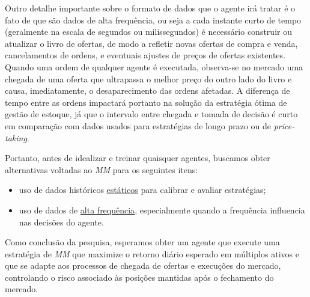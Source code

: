 Outro detalhe importante sobre o formato de dados que o agente irá tratar é o fato de que são dados de alta frequência, ou seja a cada instante curto de tempo (geralmente na escala de segundos ou milissegundos) é necessário construir ou atualizar o livro de ofertas, de modo a refletir novas ofertas de compra e venda, cancelamentos de ordens, e eventuais ajustes de preços de ofertas existentes.
Quando uma ordem de qualquer agente é executada, observa-se no mercado uma chegada de uma oferta que ultrapassa o melhor preço do outro lado do livro e causa, imediatamente, o desaparecimento das ordens afetadas. A diferença de tempo entre as ordens impactará portanto na solução da estratégia ótima de gestão de estoque, já que o intervalo entre chegada e tomada de decisão é curto em comparação com dados usados para estratégias de longo prazo ou de \textit{price-taking}.

Portanto, antes de idealizar e treinar quaisquer agentes, buscamos obter alternativas voltadas ao \textit{MM} para os seguintes itens: 
\begin{itemize}
    \item uso de dados históricos \underline{estáticos} para calibrar e avaliar estratégias;
    \item uso de dados de \underline{alta frequência}, especialmente quando a frequência influencia nas decisões do agente.
\end{itemize}

Como conclusão da pesquisa, esperamos obter um agente que execute uma estratégia de \textit{MM} que maximize o retorno diário esperado em múltiplos ativos e que se adapte aos processos de chegada de ofertas e execuções do mercado, controlando o risco associado às posições mantidas após o fechamento do mercado. 


